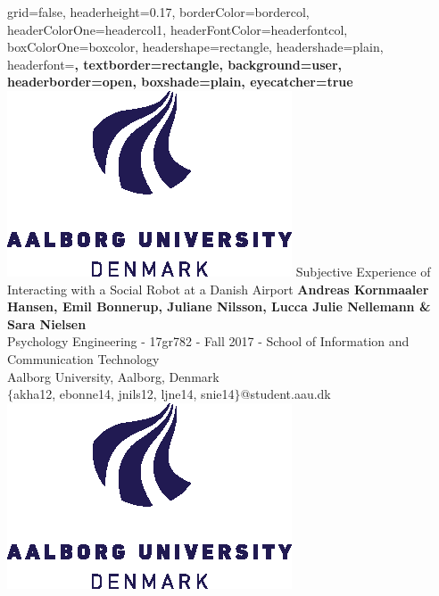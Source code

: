 \documentclass[paperwidth=160cm,paperheight=100cm,landscape,fontscale=0.2941]{baposter}
\begin{document}
\graphicspath{{Pictures/}}
\background{ %

}

\begin{poster}{
grid=false,
headerheight=0.17\textheight,
borderColor=bordercol, %
headerColorOne=headercol1, %
headerFontColor=headerfontcol, %
boxColorOne=boxcolor, %
headershape=rectangle, %
headershade=plain,
headerfont=\Large\sf\bf, %
textborder=rectangle,
background=user,
headerborder=open, %
boxshade=plain,
eyecatcher=true
}
%
%
{
\includegraphics[height=0.13\textheight]{aau_logo_new.eps}
} %
{\vspace{2pt}
Subjective Experience of Interacting with a Social Robot at a Danish Airport}
{
\vspace{3pt}
\normalsize{\textbf{Andreas Kornmaaler Hansen, Emil Bonnerup, Juliane Nilsson, Lucca Julie Nellemann \& Sara Nielsen}\\
Psychology Engineering - 17gr782 - Fall 2017 - School of Information and Communication Technology\\ Aalborg University, Aalborg, Denmark\\ }
$\{$akha12, ebonne14, jnils12, ljne14, snie14$\}$@student.aau.dk\\
}
{
\includegraphics[height=0.13\textheight]{aau_logo_new.eps}
}


\end{poster}
\end{document}
